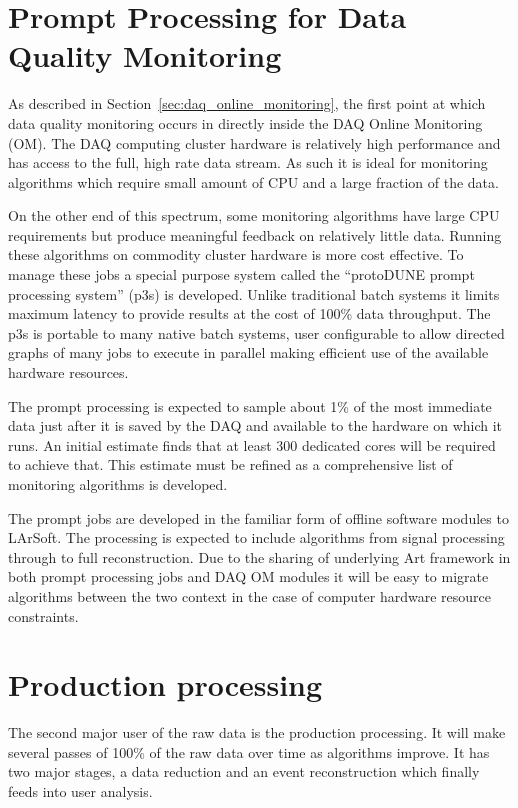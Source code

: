 \section{Prompt Processing for Data Quality Monitoring}
\label{sec:prompt_processing}

As described in Section~\ref{sec:daq_online_monitoring}, the first
point at which data quality monitoring occurs in directly inside the
DAQ Online Monitoring (OM).  The DAQ computing cluster hardware is
relatively high performance and has access to the full, high rate data
stream.  As such it is ideal for monitoring algorithms which require
small amount of CPU and a large fraction of the data.

On the other end of this spectrum, some monitoring algorithms have
large CPU requirements but produce meaningful feedback on relatively
little data.  Running these algorithms on commodity cluster hardware
is more cost effective.  To manage these jobs a special purpose system
called the ``protoDUNE prompt processing system'' (p3s) is developed.
Unlike traditional batch systems it limits maximum latency to provide
results at the cost of 100\% data throughput.  The p3s is portable to
many native batch systems, user configurable to allow directed graphs
of many jobs to execute in parallel making efficient use of the
available hardware resources.

The prompt processing is expected to sample about 1\% of the most
immediate data just after it is saved by the DAQ and available to the
hardware on which it runs.  An initial estimate finds that at least
300 dedicated cores will be required to achieve that.  This estimate
must be refined as a comprehensive list of monitoring algorithms is
developed.

The prompt jobs are developed in the familiar form of offline software
modules to LArSoft.  The processing is expected to include algorithms
from signal processing through to full reconstruction.  Due to the
sharing of underlying Art framework in both prompt processing jobs and
DAQ OM modules it will be easy to migrate algorithms between the two
context in the case of computer hardware resource constraints.

\section{Production processing}
\label{sec:protodune-offline}

The second major user of the raw data is the production processing.
It will make several passes of 100\% of the raw data over time as
algorithms improve.  It has two major stages, a data reduction and an
event reconstruction which finally feeds into user analysis.

